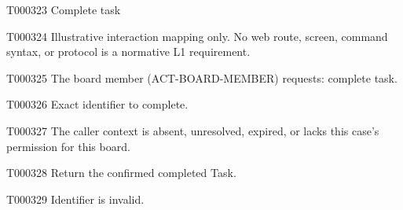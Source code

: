 \documentclass[11pt,a4paper]{article}
\begin{document}
\begin{atlastext}{T000323}
Complete task
\end{atlastext}
\begin{atlasparagraph}{T000324}
Illustrative interaction mapping only. No web route, screen, command syntax, or protocol is a normative L1 requirement.
\end{atlasparagraph}
\begin{atlasparagraph}{T000325}
The board member (ACT-BOARD-MEMBER) requests: complete task.
\end{atlasparagraph}
\begin{atlasparagraph}{T000326}
Exact identifier to complete.
\end{atlasparagraph}
\begin{atlasparagraph}{T000327}
The caller context is absent, unresolved, expired, or lacks this case's permission for this board.
\end{atlasparagraph}
\begin{atlasparagraph}{T000328}
Return the confirmed completed Task.
\end{atlasparagraph}
\begin{atlasparagraph}{T000329}
Identifier is invalid.
\end{atlasparagraph}
\end{document}
